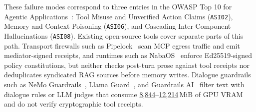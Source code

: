 \documentclass[10pt,twocolumn]{article}
\begin{document}
These failure modes correspond to three entries in the OWASP Top 10 for Agentic Applications~\cite{owasp2026agentic}: Tool Misuse and Unverified Action Claims (\texttt{ASI02}), Memory and Context Poisoning (\texttt{ASI06}), and Cascading Inter-Component Hallucinations (\texttt{ASI08}). Existing open-source tools cover separate parts of this path. Transport firewalls such as Pipelock~\cite{pipelock2026} scan MCP egress traffic and emit mediator-signed receipts, and runtimes such as NabaOS~\cite{nabaos2026} enforce Ed25519-signed policy constitutions, but neither checks post-turn prose against tool receipts nor deduplicates syndicated RAG sources before memory writes. Dialogue guardrails such as NeMo Guardrails~\cite{rebedea2023nemo}, Llama Guard~\cite{inan2023llamaguard}, and Guardrails AI~\cite{guardrailsai2024} filter text with dialogue rules or LLM judges that consume \href{https://github.com/AlienatedAliens/epistemic-guard/blob/v0.5.2/results/table3_heldout_supervision.json\#L166}{8,844}--\href{https://github.com/AlienatedAliens/epistemic-guard/blob/v0.5.2/results/table3_heldout_supervision.json\#L182}{12,214}\,MiB of GPU VRAM and do not verify cryptographic tool receipts.
\end{document}
